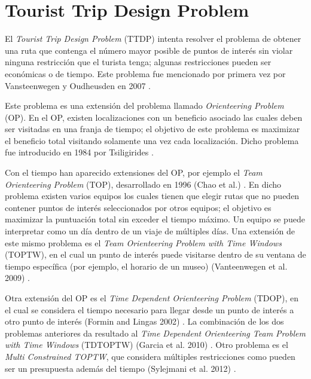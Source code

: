 \section[Tourist Trip Design Problem]{Tourist Trip Design Problem}
El \textit{Tourist Trip Design Problem} (TTDP) intenta resolver el problema de obtener una ruta que contenga el número mayor posible de puntos de interés sin violar ninguna restricción que el turista tenga; algunas restricciones pueden ser económicas o de tiempo. Este problema fue mencionado por primera vez por Vansteenwegen y Oudheusden en 2007 \cite{first_article_TTDP}.\newline

Este problema es una extensión del problema llamado \textit{Orienteering Problem} (OP). En el OP, existen localizaciones con un beneficio asociado las cuales deben ser visitadas en una franja de tiempo; el objetivo de este problema es maximizar el beneficio total visitando solamente una vez cada localización. Dicho problema fue introducido en 1984 por Tsiligirides \cite{first_article_OP}.\newline

Con el tiempo han aparecido extensiones del OP, por ejemplo el \textit{Team Orienteering Problem} (TOP), desarrollado en 1996 (Chao et al.) \cite{Chao}. En dicho problema existen varios equipos los cuales tienen que elegir rutas que no pueden contener puntos de interés seleccionados por otros equipos; el objetivo es maximizar la puntuación total sin exceder el tiempo máximo. Un equipo se puede interpretar como un día dentro de un viaje de múltiples días. Una extensión de este mismo problema es el \textit{Team Orienteering Problem with Time Windows} (TOPTW), en el cual un punto de interés puede visitarse  dentro de su ventana de tiempo específica (por ejemplo, el horario de un museo) (Vanteenwegen et al. 2009) \cite{TOPTW}.\newline

Otra extensión del OP es el \textit{Time Dependent Orienteering Problem} (TDOP), en el cual se considera el tiempo necesario para llegar desde un punto de interés a otro punto de interés (Formin and Lingas 2002) \cite{TDOP}. La combinación de los dos problemas anteriores da resultado al \textit{Time Dependent Orienteering Team Problem with Time Windows} (TDTOPTW) (Garcia et al. 2010) \cite{TDTOPTW}. Otro problema es el \textit{Multi Constrained TOPTW}, que considera múltiples restricciones como pueden ser un presupuesta además del tiempo (Sylejmani et al. 2012) \cite{multiconstrained_toptw}.\newline

